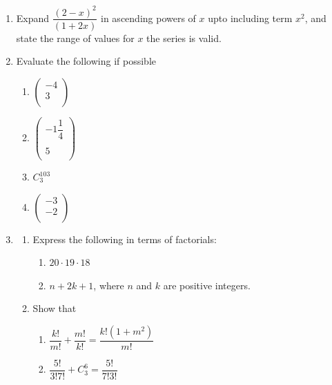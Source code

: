 \documentclass[11pt,a4paper]{article}
\begin{document}
\begin{enumerate}
\item
Expand $\dfrac{(2-x)^2}{(1+2x)}$ in ascending powers of $x$ upto including term $x^2$, and state the range of values for $x$ the series is valid.\\

\item
Evaluate the following if possible
\begin{enumerate}
      \item $
\begin{pmatrix}
-4\\3\\
\end{pmatrix}     
$\\
       \item $
\begin{pmatrix}
-1\dfrac{1}{4}\\\\ 5\\
\end{pmatrix}      
$\\
        \item $C^{103}_3$\\
        \item $
\begin{pmatrix}
-3\\-2\\
\end{pmatrix}        
$\\
\end{enumerate}

\item
\begin{enumerate}
     \item Express the following in terms of factorials:
\begin{enumerate}
           \item $20\cdot 19 \cdot 18$
           \item $n+2k+1$, where $n$ and $k$ are positive integers.
\end{enumerate}     
     
     \item  Show that
\begin{enumerate}
             \item $\dfrac{k!}{m!}+\dfrac{m!}{k!}=\dfrac{k!(1+m^2)}{m!}$\\
             \item $\dfrac{5!}{3!7!}+C^6_3=\dfrac{5!}{7!3!}$\\
\end{enumerate}
\end{enumerate}
\end{enumerate}
\end{document}
